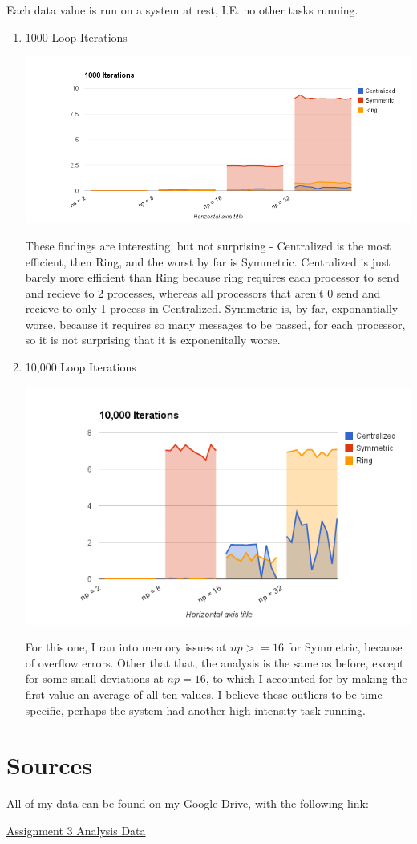 \documentclass{article}%
\begin{document}
Each data value is run on a system at rest, I.E. no other tasks running.
\begin{enumerate}
\item 1000 Loop Iterations

\includegraphics[scale=0.5]{chart_1.png}

These findings are interesting, but not surprising - Centralized is the most efficient, then Ring, and the worst by far is Symmetric. 
Centralized is just barely more efficient than Ring because ring requires each processor to send and recieve to 2 processes, whereas all processors that aren't
0 send and recieve to only 1 process in Centralized. 
Symmetric is, by far, exponantially worse, because it requires so many messages to be passed, for each processor, so it is not surprising that it is exponenitally worse.
\vspace{20mm}
\item 10,000 Loop Iterations

\includegraphics[scale=0.7]{chart_2.png}

For this one, I ran into memory issues at $np >= 16$ for Symmetric, because of overflow errors.
Other that that, the analysis is the same as before, except for some small deviations at $np = 16$, to which I accounted for by making the first value an average of all ten values. I believe these outliers to be time specific, perhaps the system had another high-intensity task running. 
\end{enumerate}

\section*{Sources}
All of my data can be found on my Google Drive, with the following link:
\vspace{10mm}

\href{https://docs.google.com/spreadsheet/ccc?key=0AtGVZx-NN2eVdEFtdGFROGFaSDQ3bVVVb2dwWmpOdGc&usp=sharing}{Assignment 3 Analysis Data}
\end{document}
